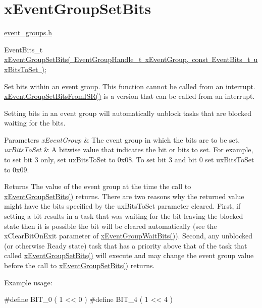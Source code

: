 \hypertarget{group__x_event_group_set_bits}{}\section{x\+Event\+Group\+Set\+Bits}
\label{group__x_event_group_set_bits}
\mbox{\hyperlink{event__groups_8h}{event\+\_\+groups.\+h}} 
\begin{DoxyPre}
   EventBits\_t \mbox{\hyperlink{event__groups_8h_a02d7b3bb55f7e11d9c47116266c5fb2e}{xEventGroupSetBits( EventGroupHandle\_t xEventGroup, const EventBits\_t uxBitsToSet )}};
\end{DoxyPre}


Set bits within an event group. This function cannot be called from an interrupt. \mbox{\hyperlink{event__groups_8h_a62b68278abac6358369ae8e390988a02}{x\+Event\+Group\+Set\+Bits\+From\+I\+S\+R()}} is a version that can be called from an interrupt.

Setting bits in an event group will automatically unblock tasks that are blocked waiting for the bits.


\begin{DoxyParams}{Parameters}
{\em x\+Event\+Group} & The event group in which the bits are to be set.\\
\hline
{\em ux\+Bits\+To\+Set} & A bitwise value that indicates the bit or bits to set. For example, to set bit 3 only, set ux\+Bits\+To\+Set to 0x08. To set bit 3 and bit 0 set ux\+Bits\+To\+Set to 0x09.\\
\hline
\end{DoxyParams}
\begin{DoxyReturn}{Returns}
The value of the event group at the time the call to \mbox{\hyperlink{event__groups_8h_a02d7b3bb55f7e11d9c47116266c5fb2e}{x\+Event\+Group\+Set\+Bits()}} returns. There are two reasons why the returned value might have the bits specified by the ux\+Bits\+To\+Set parameter cleared. First, if setting a bit results in a task that was waiting for the bit leaving the blocked state then it is possible the bit will be cleared automatically (see the x\+Clear\+Bit\+On\+Exit parameter of \mbox{\hyperlink{event__groups_8h_aab9d5b405bc57b7624dcabe9a9a503db}{x\+Event\+Group\+Wait\+Bits()}}). Second, any unblocked (or otherwise Ready state) task that has a priority above that of the task that called \mbox{\hyperlink{event__groups_8h_a02d7b3bb55f7e11d9c47116266c5fb2e}{x\+Event\+Group\+Set\+Bits()}} will execute and may change the event group value before the call to \mbox{\hyperlink{event__groups_8h_a02d7b3bb55f7e11d9c47116266c5fb2e}{x\+Event\+Group\+Set\+Bits()}} returns.
\end{DoxyReturn}
Example usage\+: 
\begin{DoxyPre}
  \#define BIT\_0 ( 1 << 0 )
  \#define BIT\_4 ( 1 << 4 )\end{DoxyPre}



